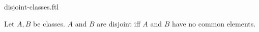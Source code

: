 \documentclass{stex}
\begin{document}
\begin{smodule}{disjoint-classes.ftl}

  \begin{forthel}
    \begin{definition}
      Let $A, B$ be classes.
      $A$ and $B$ are disjoint iff $A$ and $B$ have no common elements.
    \end{definition}
  \end{forthel}
\end{smodule}
\end{document}
